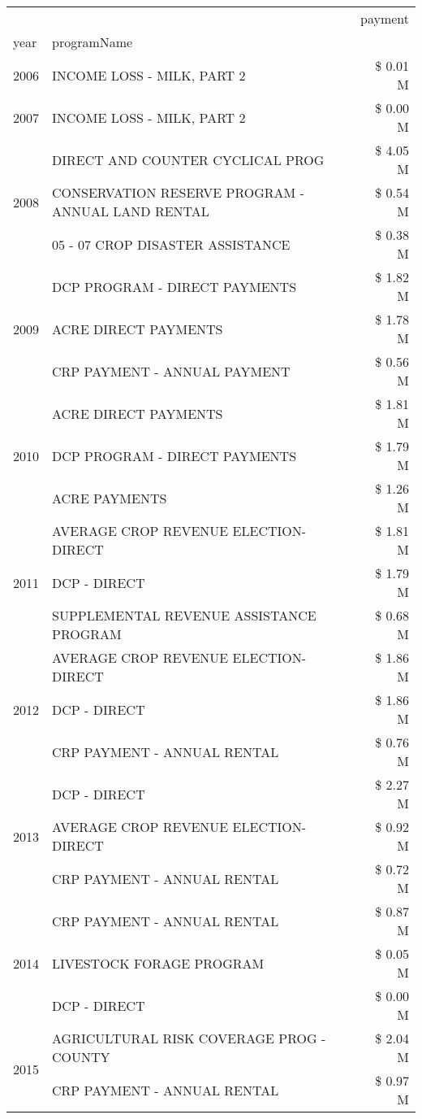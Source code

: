 \begin{tabular}{llr}
\toprule
 &  & payment \\
year & programName &  \\
\midrule
2006 & INCOME LOSS - MILK, PART 2 & \$ 0.01 M \\
\cline{1-3}
2007 & INCOME LOSS - MILK, PART 2 & \$ 0.00 M \\
\cline{1-3}
\multirow[t]{3}{*}{2008} & DIRECT AND COUNTER CYCLICAL PROG & \$ 4.05 M \\
 & CONSERVATION RESERVE PROGRAM - ANNUAL LAND RENTAL & \$ 0.54 M \\
 & 05 - 07 CROP DISASTER ASSISTANCE & \$ 0.38 M \\
\cline{1-3}
\multirow[t]{3}{*}{2009} & DCP PROGRAM - DIRECT PAYMENTS & \$ 1.82 M \\
 & ACRE DIRECT PAYMENTS & \$ 1.78 M \\
 & CRP PAYMENT - ANNUAL PAYMENT & \$ 0.56 M \\
\cline{1-3}
\multirow[t]{3}{*}{2010} & ACRE DIRECT PAYMENTS & \$ 1.81 M \\
 & DCP PROGRAM - DIRECT PAYMENTS & \$ 1.79 M \\
 & ACRE PAYMENTS & \$ 1.26 M \\
\cline{1-3}
\multirow[t]{3}{*}{2011} & AVERAGE CROP REVENUE ELECTION-DIRECT & \$ 1.81 M \\
 & DCP - DIRECT & \$ 1.79 M \\
 & SUPPLEMENTAL REVENUE ASSISTANCE PROGRAM & \$ 0.68 M \\
\cline{1-3}
\multirow[t]{3}{*}{2012} & AVERAGE CROP REVENUE ELECTION-DIRECT & \$ 1.86 M \\
 & DCP - DIRECT & \$ 1.86 M \\
 & CRP PAYMENT - ANNUAL RENTAL & \$ 0.76 M \\
\cline{1-3}
\multirow[t]{3}{*}{2013} & DCP - DIRECT & \$ 2.27 M \\
 & AVERAGE CROP REVENUE ELECTION-DIRECT & \$ 0.92 M \\
 & CRP PAYMENT - ANNUAL RENTAL & \$ 0.72 M \\
\cline{1-3}
\multirow[t]{3}{*}{2014} & CRP PAYMENT - ANNUAL RENTAL & \$ 0.87 M \\
 & LIVESTOCK FORAGE PROGRAM & \$ 0.05 M \\
 & DCP - DIRECT & \$ 0.00 M \\
\cline{1-3}
\multirow[t]{3}{*}{2015} & AGRICULTURAL RISK COVERAGE PROG - COUNTY & \$ 2.04 M \\
 & CRP PAYMENT - ANNUAL RENTAL & \$ 0.97 M \\

\end{tabular}
